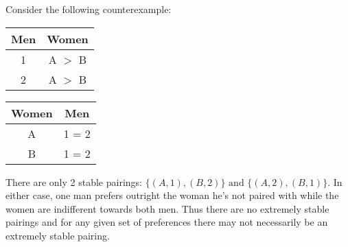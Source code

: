 \documentclass[11pt,fleqn]{article}
\begin{document}
\begin{enumerate}
\begin{enumerate}
Consider the following counterexample:
\begin{center}
\begin{minipage}{2in}
    \begin{tabular}{|c|c|}
      \hline
          \mbox{Men} & \mbox{Women} \\ \hline
      1 & A \hspace{0.2cm}$>$\hspace{0.2cm} B \\ \hline
      2 & A \hspace{0.2cm}$>$\hspace{0.2cm} B \\ \hline
    \end{tabular}
\end{minipage}
\begin{minipage}{2in}
    \begin{tabular}{|c|c|}
      \hline
          \mbox{Women} & \mbox{Men} \\ \hline
      A & 1 \hspace{0.2cm}=\hspace{0.2cm}  2  \\ \hline
      B & 1 \hspace{0.2cm}=\hspace{0.2cm}  2 \\ \hline
    \end{tabular}
\end{minipage}
\end{center}
There are only 2 stable pairings: $\{(A,1),(B,2)\}\text{ and }\{(A,2),(B,1)\}$. In either case, one man prefers outright the woman he's not paired with while the women are indifferent towards both men. Thus there are no extremely stable pairings and for any given set of preferences there may not necessarily be an extremely stable pairing.
\end{enumerate}


\end{enumerate}
\end{document}
